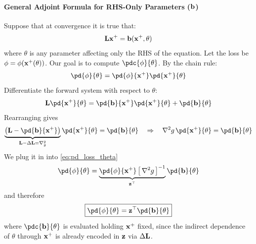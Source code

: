 \begin{derivation}
\paragraph{General Adjoint Formula for RHS-Only Parameters ($\mathbf{b}$)}
\mbox{}

\noindent Suppose that at convergence it is true that:
\begin{equation*}
    \mathbf{L}\mathbf{x}^+ = \mathbf{b}(\mathbf{x}^+,\theta)
\end{equation*}
where $\theta$ is any parameter affecting only the RHS of the equation. Let the loss be $\phi = \phi(\mathbf{x}^+(\theta))$. Our goal is to compute $\pdc{\phi}{\theta}$.
\newline By the chain rule:
\begin{equation}
\label{eq:pd_loss_theta}
    \pd{\phi}{\theta}
    =
    \pd{\phi}{\x^+}
    \pd{\x^+}{\theta}
\end{equation}
Differentiate the forward system with respect to $\theta$:
\begin{equation}
    \LL
    \pd{\x^+}{\theta}
    =
    \pd{\bb}{\x^+}
    \pd{\x^+}{\theta}
    +
    \pd{\bb}{\theta}
\end{equation}
Rearranging gives
\begin{equation}
    \underbrace{\left(
        \LL - \pd{\bb}{\x^+}
    \right)}_{\LL - \Delta \LL = \nabla^2_g}
    \pd{\x^+}{\theta}
    =
    \pd{\bb}{\theta}
\quad \Rightarrow \quad
    \nabla^2 g\,
    \pd{\x^+}{\theta}
    =
    \pd{\bb}{\theta}
\end{equation}
We plug it in into \eqref{eq:pd_loss_theta}
\begin{equation}
    \pd{\phi}{\theta} = 
    \underbrace{\pd{\phi}{\x^+}\left[\,\nabla^2{g}\,\right]^{-1}}_{\z^\top} \pd{\bb}{\theta}
\end{equation}
and therefore
\begin{equation}
    \boxed{
    \pd{\phi}{\theta}
    =
    \z^\top
    \pd{\bb}{\theta}
    }
\end{equation}
where $\pdc{\bb}{\theta}$ is evaluated holding $\mathbf{x}^+$ fixed,  since the indirect dependence of $\theta$ through $\mathbf{x}^+$ is already encoded in $\mathbf{z}$ via $\Delta\mathbf{L}$.
\end{derivation}

